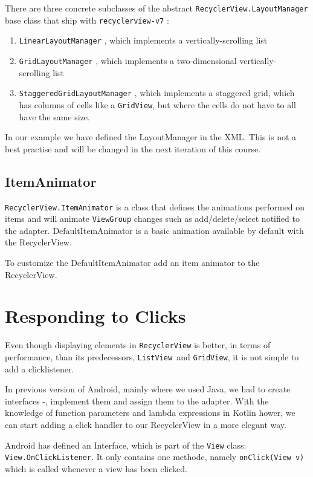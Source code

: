 There are three concrete subclasses of the abstract \lstinline!RecyclerView.LayoutManager! base class that ship with \lstinline!recyclerview-v7! :
\begin{enumerate}
	\item \lstinline!LinearLayoutManager! , which implements a vertically-scrolling list
	\item \lstinline!GridLayoutManager! ,
	which implements a two-dimensional vertically-
	scrolling list
	\item \lstinline!StaggeredGridLayoutManager! , which implements a staggered grid, which has columns of cells like a \lstinline!GridView!, but where the cells do not have to all have the same size.
\end{enumerate}

In our example we have defined the LayoutManager in the XML.
This is not a best practise and will be changed in the next iteration of this course.

\subsection{ItemAnimator}
\lstinline!RecyclerView.ItemAnimator! is a class that defines the animations performed on items and will animate \lstinline!ViewGroup! changes such as add/delete/select notified to the adapter.
DefaultItemAnimator is a basic animation available by default with the RecyclerView.

To customize the DefaultItemAnimator add an item animator to the RecyclerView.

\section{Responding to Clicks}
Even though displaying elements in \lstinline|RecyclerView| is better, in terms of performance, than its predecessors,  \lstinline|ListView |and  \lstinline|GridView|, it is not simple to add a clicklistener.

In previous version of Android, mainly where we used Java, we had to create interfaces -, implement them and assign them to the adapter.
With the knowledge of function parameters and lambda expressions in Kotlin hower, we can start adding a click handler to our RecyclerView in a more elegant way.

Android has defined an Interface, which is part of the \lstinline|View|  class: \lstinline|View.OnClickListener|.
It only contains one methode, namely \lstinline|onClick(View v)| which is called whenever a view has been clicked.

